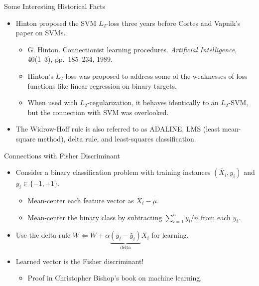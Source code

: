 \begin{frame}{Some Interesting Historical Facts}
\begin{itemize}
\item Hinton proposed the SVM $L_2$-loss three years before Cortes
and Vapnik's paper on SVMs. \begin{itemize}
 \item G. Hinton. Connectionist learning procedures. {\em
Artificial Intelligence}, 40(1--3), pp.~185--234, 1989.
\item Hinton's $L_2$-loss was proposed to address some of the
weaknesses of loss functions like linear regression on binary
targets. \item When used with $L_2$-regularization, it behaves
identically to an $L_2$-SVM, but the connection with SVM was
overlooked.
\end{itemize}
\item The Widrow-Hoff rule is also referred to as ADALINE, LMS
(least mean-square method), delta rule, and least-squares
classification.
\end{itemize}
\end{frame}


\begin{frame}{Connections with Fisher Discriminant}
\begin{itemize}
\item Consider a binary classification problem with training
instances $(\overline{X}_i, y_i)$ and $y_i \in \{ -1, +1 \}$.
\begin{itemize}
\item Mean-center each feature vector as $\overline{X_i} - \overline{\mu}$.
\item Mean-center the binary class by  subtracting $\sum_{i=1}^n
y_i/n$ from each $y_i$.
\end{itemize}
\item Use the delta rule $\overline{W} \Leftarrow
 \overline{W}+ \alpha \underbrace{(y_i - \hat{y}_i)}_{\mbox{delta}} \overline{X}_i$ for
 learning.
\item Learned vector is the Fisher discriminant!
\begin{itemize}
\item Proof in  Christopher Bishop's book on machine learning.
\end{itemize}
\end{itemize}
\end{frame}




